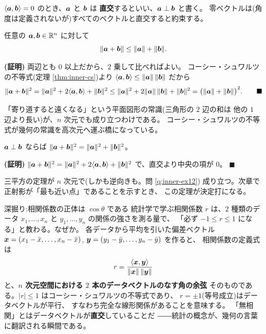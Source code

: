 \begin{teigi}[直交]\label{def:inner-orth}
$\langle \bm{a}, \bm{b} \rangle = 0$ のとき、$\bm{a}$ と $\bm{b}$ は
\textbf{直交}するといい、$\bm{a} \perp \bm{b}$ と書く。
零ベクトルは(角度は定義されないが)すべてのベクトルと直交すると約束する。
\end{teigi}

\begin{teiri}[三角不等式]\label{thm:inner-triangle}
任意の $\bm{a}, \bm{b} \in \mathbb{R}^n$ に対して
\[
\|\bm{a} + \bm{b}\| \le \|\bm{a}\| + \|\bm{b}\|.
\]
\end{teiri}

\noindent\textbf{(証明)}\quad
両辺とも $0$ 以上だから、$2$ 乗して比べればよい。
コーシー・シュワルツの不等式(定理 \ref{thm:inner-cs})より
$\langle \bm{a}, \bm{b} \rangle \le \|\bm{a}\|\,\|\bm{b}\|$ だから
\[
\|\bm{a} + \bm{b}\|^2
= \|\bm{a}\|^2 + 2\langle \bm{a}, \bm{b} \rangle + \|\bm{b}\|^2
\le \|\bm{a}\|^2 + 2\|\bm{a}\|\,\|\bm{b}\| + \|\bm{b}\|^2
= \bigl(\|\bm{a}\| + \|\bm{b}\|\bigr)^2. \qquad\blacksquare
\]

「寄り道すると遠くなる」という平面図形の常識(三角形の $2$ 辺の和は
他の $1$ 辺より長い)が、$n$ 次元でも成り立つわけである。
コーシー・シュワルツの不等式が幾何の常識を高次元へ運ぶ橋になっている。

\begin{teiri}[ピタゴラスの定理]\label{thm:inner-pyth}
$\bm{a} \perp \bm{b}$ ならば
$\|\bm{a} + \bm{b}\|^2 = \|\bm{a}\|^2 + \|\bm{b}\|^2$。
\end{teiri}

\noindent\textbf{(証明)}\quad
$\|\bm{a} + \bm{b}\|^2 = \|\bm{a}\|^2 + 2\langle \bm{a}, \bm{b} \rangle
+ \|\bm{b}\|^2$ で、直交より中央の項が $0$。 $\blacksquare$

三平方の定理が $n$ 次元で(しかも逆向きも。問 \ref{q:inner-ex12})
成り立つ。次章で正射影が「最も近い点」であることを示すとき、
この定理が決定打になる。

\begin{itembox}[l]{深掘り:相関係数の正体は $\cos\theta$ である}
統計学で学ぶ相関係数 $r$ は、$2$ 種類のデータ
$x_1, \dots, x_n$ と $y_1, \dots, y_n$ の関係の強さを測る量で、
「必ず $-1 \le r \le 1$ になる」と教わる。なぜか。
各データから平均を引いた偏差ベクトル
$\bm{x} = (x_1 - \bar{x}, \dots, x_n - \bar{x})$,
$\bm{y} = (y_1 - \bar{y}, \dots, y_n - \bar{y})$ を作ると、
相関係数の定義式は
\[
r = \frac{\langle \bm{x}, \bm{y} \rangle}{\|\bm{x}\|\,\|\bm{y}\|}
\]
と、\textbf{$n$ 次元空間における $2$ 本のデータベクトルのなす角の余弦}
そのものである。$|r| \le 1$ はコーシー・シュワルツの不等式であり、
$r = \pm 1$(等号成立)はデータベクトルが平行、
すなわち完全な線形関係があることを意味する。
「無相関」とはデータベクトルが\textbf{直交}していることだ
――統計の概念が、幾何の言葉に翻訳される瞬間である。
\end{itembox}

